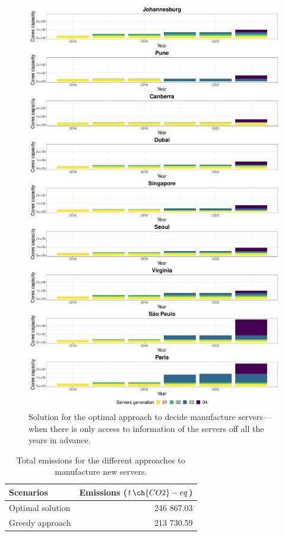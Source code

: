 \begin{figure}[ht]
\centering
  \includegraphics[width=\linewidth]{images/dc_evolution_optimal.pdf}
  \caption{Solution for the optimal approach to decide manufacture servers---when there is only access to information of the servers off all the years in advance.}
  \label{fig:dc_evolution_optimal}
\end{figure}


\begin{table}[!ht]
  
\caption{Total emissions for the different approaches to manufacture new servers.}\label{tab:emissions_sizing} \centering
\begin{tabular}{|l|r|}
  \hline
  \textbf{Scenarios} & \textbf{Emissions ($t\,\ch{CO2}-eq$)}   \\
  \hline  
   Optimal solution  &   246 867.03 \\  
  \hline
   Greedy approach                   &   213 730.59  \\
  \hline

\end{tabular}
\end{table}


